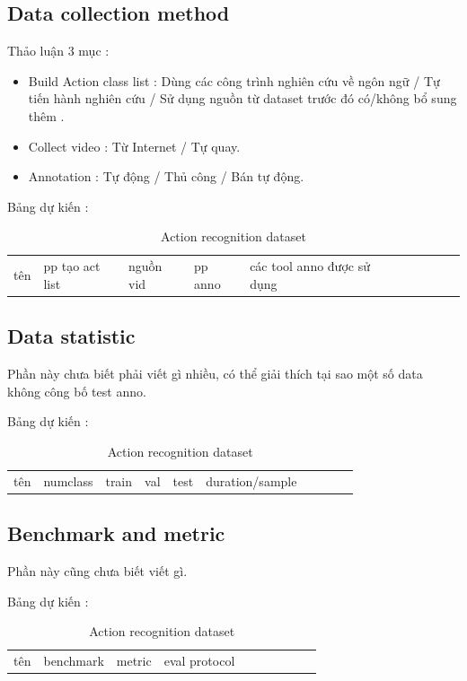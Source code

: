\documentclass[a4paper]{article}
\begin{document}
\subsection{Data collection method}
Thảo luận 3 mục : 
\begin{itemize}
	\item Build Action class list : Dùng các công trình nghiên cứu về ngôn ngữ / Tự tiến hành nghiên cứu / Sử dụng nguồn từ dataset trước đó có/không bổ sung thêm .
	\item Collect video : Từ Internet / Tự quay.
	\item Annotation : Tự động / Thủ công / Bán tự động.
\end{itemize}

Bảng dự kiến : 

\begin{table}[h]
	\centering
	\caption{Action recognition dataset}
	\begin{tabular}{l|l l l l l l l l l}
		\toprule
		tên & pp tạo act list & nguồn vid & pp anno & các tool anno được sử dụng \\
	\end{tabular}%
	\label{config}
\end{table}%

\subsection{Data statistic}

Phần này chưa biết phải viết gì nhiều, có thể giải thích tại sao một số data không công bố test anno.

Bảng dự kiến : 

\begin{table}[h]
	\centering
	\caption{Action recognition dataset}
	\begin{tabular}{l|l l l l l l l l l}
		\toprule
		tên & numclass & train & val & test & duration/sample \\
	\end{tabular}%
	\label{config2}
\end{table}%

\subsection{Benchmark and metric}

Phần này cũng chưa biết viết gì.

Bảng dự kiến : 

\begin{table}[h]
	\centering
	\caption{Action recognition dataset}
	\begin{tabular}{l|l l l l l l l l l}
		\toprule
		tên & benchmark & metric & eval protocol \\
	\end{tabular}%
	\label{config3}
\end{table}%
\end{document}
